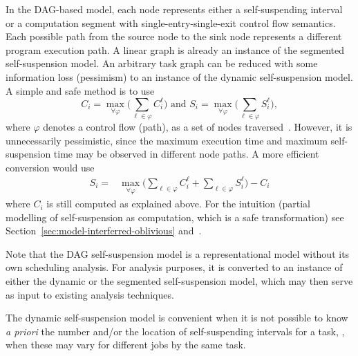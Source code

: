 In the DAG-based model\cite{bletsas:thesis}, each node represents either a self-suspending interval or a computation segment
with single-entry-single-exit control flow semantics. Each possible path from the source node to the sink node
represents a different program execution path. A linear graph is already an instance of the segmented self-suspension model.
An arbitrary task graph can be reduced with some information loss (pessimism) to an instance of the dynamic self-suspension model. 
%
%
%
A simple and safe method is to use
\begin{equation*} 
C_i =  \max_{\forall \varphi} \Big(  \sum_{\ell \in \varphi} C_i^\ell   \Big)        \mbox{   and }
S_i =  \max_{\forall \varphi} \Big(  \sum_{\ell \in \varphi} S_i^\ell   \Big),
\end{equation*}
where $\varphi$ denotes a control flow (path), as a set of nodes traversed~\cite{RTAS-AudsleyB04,bletsas:thesis}. However, it is unnecessarily pessimistic, since the maximum execution time and maximum self-suspension 
time may be observed in different node paths. A more efficient conversion would use
\begin{align} 
S_i =  &\max_{\forall \varphi} \Big(  \sum_{\ell \in \varphi} C_i^\ell + \sum_{\ell \in \varphi} S_i^\ell   \Big)  - C_i  \nonumber
\end{align}
where $C_i$ is still computed as explained above. For the intuition (partial modelling of self-suspension as computation, which is a safe transformation) 
see Section~\ref{sec:model-interferred-oblivious} and~\cite{RTAS-AudsleyB04,BletsasReport2015}.

Note that the DAG self-suspension model is a representational model without its own scheduling analysis. For analysis purposes, it is converted to an instance of either the dynamic or the segmented self-suspension model, which may then serve as input to existing analysis techniques. 

The dynamic self-suspension model is convenient when it is not possible to know \textit{a priori} the number and/or the location of self-suspending intervals for a task, \eg, when these may vary for different jobs by the same task.

